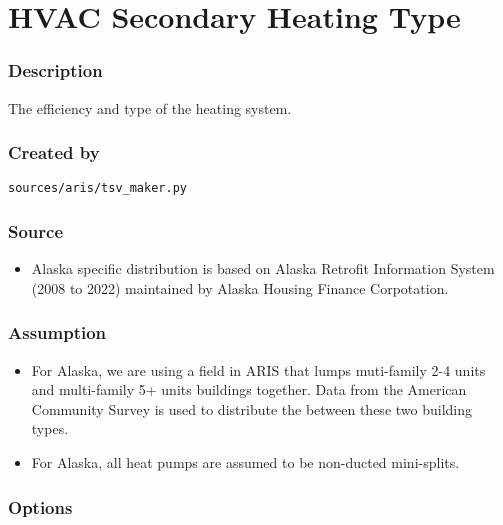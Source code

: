 \section{HVAC Secondary Heating
Type}\label{hvac_secondary_heating_type}

\subsubsection{Description}\label{description-77}

The efficiency and type of the heating system.

\subsubsection{Created by}\label{created-by-77}

\texttt{sources/aris/tsv\_maker.py}

\subsubsection{Source}\label{source-76}

\begin{itemize}
 
\item
  Alaska specific distribution is based on Alaska Retrofit Information
  System (2008 to 2022) maintained by Alaska Housing Finance
  Corpotation.
\end{itemize}

\subsubsection{Assumption}\label{assumption-47}

\begin{itemize}
 
\item
  For Alaska, we are using a field in ARIS that lumps muti-family 2-4
  units and multi-family 5+ units buildings together. Data from the
  American Community Survey is used to distribute the between these two
  building types.
\item
  For Alaska, all heat pumps are assumed to be non-ducted mini-splits.
\end{itemize}

\subsubsection{Options}\label{options-77}

